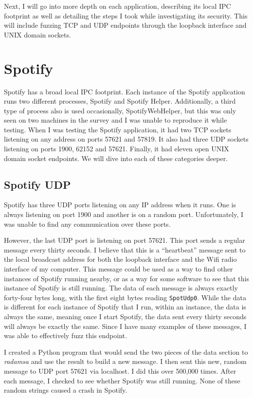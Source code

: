 Next, I will go into more depth on each application, describing its local IPC footprint as well as detailing the steps I took while investigating its security.  This will include fuzzing TCP and UDP endpoints through the loopback interface and UNIX domain sockets.

\section{Spotify}
\label{sec:spotify}
Spotify has a broad local IPC footprint.  Each instance of the Spotify application runs two different processes, Spotify and Spotify Helper.  Additionally, a third type of process also is used occasionally, SpotifyWebHelper, but this was only seen on two machines in the survey and I was unable to reproduce it while testing.  When I was testing the Spotify application, it had two TCP sockets listening on any address on ports 57621 and 57819.  It also had three UDP sockets listening on ports 1900, 62152 and 57621.  Finally, it had eleven open UNIX domain socket endpoints.  We will dive into each of these categories deeper.

\subsection{Spotify UDP}
\label{sec:spotifyUdp}
Spotify has three UDP ports listening on any IP address when it runs.  One is always listening on port 1900 and another is on a random port.  Unfortunately, I was unable to find any communication over these ports.

However, the last UDP port is listening on port 57621.  This port sends a regular message every thirty seconds.  I believe that this is a ``heartbeat'' message sent to the local broadcast address for both the loopback interface and the Wifi radio interface of my computer.  This message could be used as a way to find other instances of Spotify running nearby, or as a way for some software to see that this instance of Spotify is still running.  The data of each message is always exactly forty-four bytes long, with the first eight bytes reading \texttt{SpotUdp0}.  While the data is different for each instance of Spotify that I run, within an instance, the data is always the same, meaning once I start Spotify, the data sent every thirty seconds will always be exactly the same.  Since I have many examples of these messages, I was able to effectively fuzz this endpoint.

I created a Python program that would send the two pieces of the data section to \textit{radamsa} and use the result to build a new message.  I then sent this new, random message to UDP port 57621 via localhost.  I did this over 500,000 times.  After each message, I checked to see whether Spotify was still running.  None of these random strings caused a crash in Spotify.

